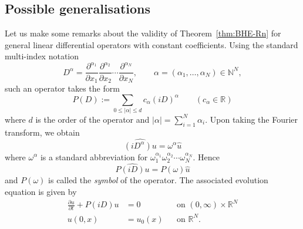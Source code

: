 \documentclass[a4paper, reqno,titlepage]{amsart}
\numberwithin{equation}{section}
\theoremstyle{plain}
\theoremstyle{definition}
\theoremstyle{remark}
\newcommand{\NN}{\mathbb{N}}
\newcommand{\RR}{\mathbb{R}}
\begin{document}
\subsection{Possible generalisations}
\label{subsec:further}
Let us make some remarks about the validity of Theorem~\ref{thm:BHE-Rn} for general linear differential operators with constant coefficients. Using the standard multi-index notation
\begin{equation*}
  D^\alpha = \frac{\partial^{\alpha_1}}{\partial x_1} \frac{\partial^{\alpha_2}}{\partial x_2} \cdots \frac{\partial^{\alpha_N}}{\partial x_N},
  \qquad \alpha = (\alpha_1, \ldots, \alpha_N) \in \NN^N,
\end{equation*}
such an operator takes the form
\begin{equation*}
  P(D) := \sum_{0 \leq |\alpha| \leq d} c_\alpha (iD)^\alpha \qquad (c_\alpha \in \RR)
\end{equation*}
where $d$ is the order of the operator and $|\alpha| = \sum_{i=1}^N \alpha_i$. Upon taking the Fourier transform, we obtain
\begin{equation*}
  \widehat{(iD^\alpha) u} = \omega^\alpha \widehat{u}
\end{equation*}
where $\omega^\alpha$ is a standard abbreviation for $\omega_1^{\alpha_1} \omega_2^{\alpha_2} \cdots \omega_N^{\alpha_N}$. Hence
\begin{equation*}
  \widehat{ P(iD)u } = P(\omega) \widehat{u}
\end{equation*}
and $P(\omega)$ is called the \emph{symbol} of the operator. The associated evolution equation is given by
\begin{equation}
  \label{eq:evol-gen}
  \begin{aligned}
    \frac{\partial u}{\partial t} + P(iD)u & = 0      &  & \text{on } (0, \infty) \times \RR^N \\
    u(0, x)                                & = u_0(x) &  & \text{on } \RR^N.
  \end{aligned}
\end{equation}
\end{document}
